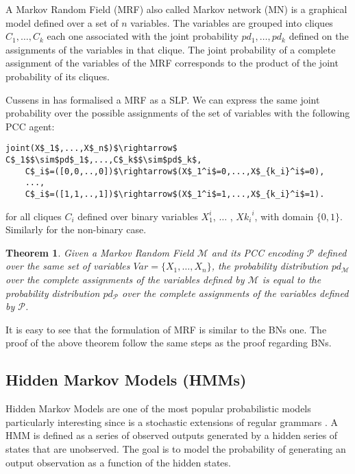 \documentclass[letterpaper]{article}
\theoremstyle{plain}
\newtheorem{theorem}{Theorem}[section]
\theoremstyle{definition}
\theoremstyle{remark}
\theoremstyle{definition}
\begin{document}
A Markov Random Field (MRF) also called Markov network (MN) is a graphical model defined over a set of $n$ variables. The variables are grouped into cliques $C_1, \ldots , C_k$ each one associated with the joint probability $pd_1, \ldots , pd_k$ defined on the assignments of the variables in that clique. The joint probability of a complete assignment of the variables of the MRF corresponds to the product of the joint probability of its cliques.

Cussens in \cite{SLPcussens2001} has formalised a MRF as a SLP.
We can express the same joint probability over the possible assignments of the set of variables with the following PCC agent:
\begin{lstlisting}[mathescape=true]
joint(X$_1$,...,X$_n$)$\rightarrow$ C$_1$$\sim$pd$_1$,...,C$_k$$\sim$pd$_k$, 
	C$_i$=([0,0,..,0])$\rightarrow$(X$_1^i$=0,...,X$_{k_i}^i$=0),
	...,
	C$_i$=([1,1,..,1])$\rightarrow$(X$_1^i$=1,...,X$_{k_i}^i$=1).
\end{lstlisting}
for all cliques $C_i$ defined over binary  variables $X_1^i$, $\ldots$ , $X{k_i}^i$, with domain $\{0,1\}$. Similarly for the non-binary case.


\begin{theorem}
Given a Markov Random Field $\mathcal{M}$ and its PCC encoding $\mathcal{P}$ defined over the same set of variables $Var= \{X_1, \ldots, X_n\}$, the probability distribution $pd_{\mathcal{M}}$ over the complete assignments of the variables defined by $\mathcal{M}$ is equal to the probability distribution $pd_{\mathcal{P}}$ over the complete assignments of the variables defined by $\mathcal{P}$.
\end{theorem}
It is easy to see that the formulation of MRF is similar to the BNs one. The proof of the above theorem follow the same steps as the proof regarding BNs.




\subsection{Hidden Markov Models (HMMs)}

 Hidden Markov Models are one of the most popular probabilistic models particularly interesting since is a stochastic extensions of regular grammars \cite{chomsky_book}. A HMM is defined as a series of observed outputs generated by a hidden series of states that are unobserved.
The goal is to model the probability of generating an output observation as a function of the hidden states.
\end{document}

